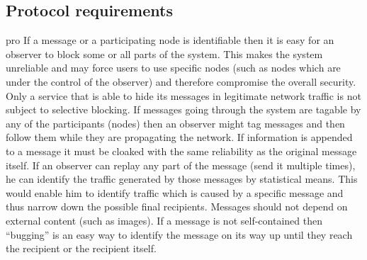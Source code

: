 \documentclass[12pt,journal,compsoc,peerreview]{IEEEtran}
\begin{document}
\subsection{Protocol requirements}
\begin{entity}{pro}
		If a message or a participating node is identifiable then it is easy for an observer to block some or all parts of the system. This makes the system unreliable and may force users to use specific nodes (such as nodes which are under the control of the observer) and therefore compromise the overall security. Only a service that is able to hide its messages in legitimate network traffic is not subject to selective blocking.
		If messages going through the system are tagable by any of the participants (nodes) then an observer might tag messages and then follow them while they are propagating the network. If information is appended to a message it must be cloaked with the same reliability as the original message itself.
		If an observer can replay any part of the message (send it multiple times), he can identify the traffic generated by those messages by statistical means. This would enable him to identify traffic which is caused by a specific message and thus narrow down the possible final recipients.
		Messages should not depend on external content (such as images). If a message is not self-contained then ``bugging'' is an easy way to identify the message on its way up until they reach the recipient or the recipient itself.
\end{entity}
\end{document}
